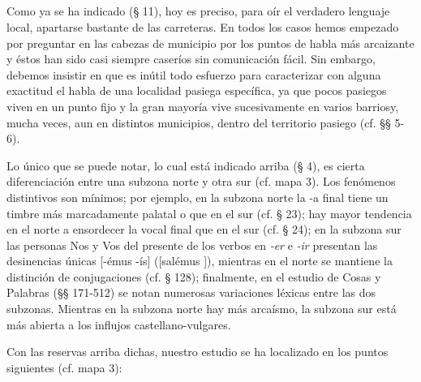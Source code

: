 \documentclass[11pt,spanish,b5paper]{book}
\begin{document}
\subsection{} Como ya se ha indicado (§ 11), hoy es preciso, para oír el verdadero lenguaje local, apartarse bastante de las carreteras. En todos los casos hemos empezado por preguntar en las cabezas de municipio por los puntos de habla más arcaizante y éstos han sido casi siempre caseríos sin comunicación fácil. Sin embargo, debemos insistir en que es inútil todo esfuerzo para caracterizar con alguna exactitud el habla de una localidad pasiega específica, ya que pocos pasiegos viven en un punto fijo y la gran mayoría vive sucesivamente en varios barriosy, mucha veces, aun en distintos municipios, dentro del territorio pasiego (cf. §§ 5-6).

Lo único que se puede notar, lo cual está indicado arriba (§ 4), es cierta diferenciación entre una subzona norte y otra sur (cf. mapa 3). Los fenómenos distintivos son mínimos; por ejemplo, en la subzona norte la -a final tiene un timbre más marcadamente palatal \textipa{[\H{5}]} o \textipa{[\`{@}]} que en el sur \textipa{[\'{5}]} (cf. § 23); hay mayor tendencia en el norte a ensordecer la vocal final que en el sur (cf. § 24); en la subzona sur las personas Nos y Vos del presente de los verbos en \textit{-er} e \textit{-ir} presentan las desinencias únicas [-émus -ís] ([salémus ]), mientras en el norte se mantiene la distinción de conjugaciones (cf. § 128); finalmente, en el estudio de Cosas y Palabras (§§ 171-512) se notan numerosas variaciones léxicas entre las dos subzonas. Mientras en la subzona norte hay más arcaísmo, la subzona sur está más abierta a los influjos castellano-vulgares. 

Con las reservas arriba dichas, nuestro estudio se ha localizado en los puntos siguientes (cf. mapa 3): 
\end{document}
